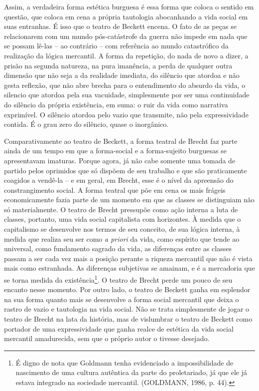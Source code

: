 Assim, a verdadeira forma estética burguesa é essa forma que coloca o
sentido em questão, que coloca em cena a própria tautologia abocanhando
a vida social em suas entranhas. É isso que o teatro de Beckett encena.
O fato de as peças se relacionarem com um mundo pós-catástrofe da guerra
não impede em nada que se possam lê-las -- ao contrário -- com
referência ao mundo catastrófico da realização da lógica mercantil. A
forma da repetição, do nada de novo a dizer, a prisão na segunda
natureza, na pura imanência, a perda de qualquer outra dimensão que não
seja a da realidade imediata, do silêncio que atordoa e não gesta
reflexão, que não abre brecha para o entendimento do absurdo da vida, o
silencio que atordoa pela sua vacuidade, simplesmente por ser uma
continuidade do silêncio da própria existência, em suma: o ruir da vida
como narrativa exprimível. O silêncio atordoa pelo vazio que transmite,
não pela expressividade contida. É o grau zero do silêncio, quase o
inorgânico.

Comparativamente ao teatro de Beckett, a forma teatral de Brecht faz
parte ainda de um tempo em que a forma-social e a forma-sujeito
burguesas se apresentavam imaturas. Porque agora, já não cabe somente
uma tomada de partido pelos oprimidos que só dispõem de seu trabalho e
que são praticamente coagidos a vendê-la -- e em geral, em Brecht, esse
é o nível da apreensão do constrangimento social. A forma teatral que
põe em cena os mais frágeis economicamente fazia parte de um momento em
que as classes se distinguiam não só materialmente. O teatro de Brecht
pressupõe como ação interna a luta de classes, portanto, uma vida social
capitalista com horizontes. À medida que o capitalismo se desenvolve nos
termos de seu conceito, de sua lógica interna, à medida que realiza seu
ser como \emph{a priori} da vida, como espírito que tende ao universal,
como fundamento sagrado da vida, as diferenças entre as classes passam a
ser cada vez mais a posição perante a riqueza mercantil que não é vista
mais como estranhada. As diferenças subjetivas se amainam, e é a
mercadoria que se torna medida da existência\footnote{É digno de nota
  que Goldmann tenha evidenciado a impossibilidade de nascimento de uma
  cultura autêntica da parte do proletariado, já que ele já estava
  integrado na sociedade mercantil. (GOLDMANN, 1986, p. 44).}. O teatro
de Brecht perde um pouco de seu encanto nesse momento. Por outro lado, o
teatro de Beckett ganha em esplendor na sua forma quanto mais se
desenvolve a forma social mercantil que deixa o rastro de vazio e
tautologia na vida social. Não se trata simplesmente de jogar o teatro
de Brecht na lata da história, mas de vislumbrar o teatro de Beckett
como portador de uma expressividade que ganha realce de estética da vida
social mercantil amadurecida, sem que o próprio autor o tivesse
desejado.

